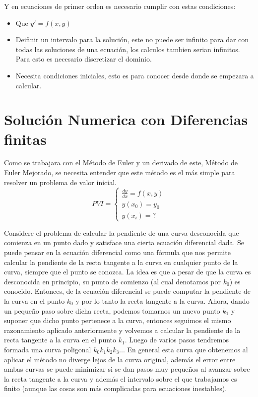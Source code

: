 \documentclass{report}
\begin{document}
Y en ecuaciones de primer orden es necesario cumplir con estas condiciones:
\begin{itemize}
\item Que $y'=f(x,y)$
\item Deifinir un intervalo para la solución, este no puede ser infinito para dar con todas las soluciones de una ecuación, los calculos tambien serian infinitos. Para esto es necesario discretizar el dominio.
\item Necesita condiciones iniciales, esto es para conocer desde donde se empezara a calcular.
\end{itemize}

\section{Solución Numerica con Diferencias finitas}
Como se trabajara con el Método de Euler y un derivado de este, Método de Euler Mejorado, se necesita entender que este método es el más simple para resolver un problema de valor inicial.
\begin{equation*}
PVI= \left\{ \begin{array}{lr}
\frac{dy}{dx} = f(x,y) \\
y(x_0)=y_0 \\
y(x_i) = ?
\end{array}\right.
\end{equation*}

Considere el problema de calcular la pendiente de una curva desconocida que comienza en un punto dado y satisface una cierta ecuación diferencial dada. Se puede pensar en la ecuación diferencial como una fórmula que nos permite calcular la pendiente de la recta tangente a la curva en cualquier punto de la curva, siempre que el punto se conozca.
La idea es que a pesar de que la curva es desconocida en principio, su punto de comienzo (al cual denotamos por $k_0$) es conocido. Entonces, de la ecuación diferencial se puede computar la pendiente de la curva en el punto $k_0$ y por lo tanto la recta tangente a la curva.
Ahora, dando un pequeño paso sobre dicha recta, podemos tomarnos un nuevo punto $k_1$ y suponer que dicho punto pertenece a la curva, entonces seguimos el mismo razonamiento aplicado anteriormente y volvemos a calcular la pendiente de la recta tangente a la curva en el punto $k_1$. Luego de varios pasos tendremos formada una curva poligonal $k_0 k_1 k_2 k_3...$ En general esta curva que obtenemos al aplicar el método no diverge lejos de la curva original, además el error entre ambas curvas se puede minimizar si se dan pasos muy pequeños al avanzar sobre la recta tangente a la curva y además el intervalo sobre el que trabajamos es finito (aunque las cosas son más complicadas para ecuaciones inestables).
\end{document}
